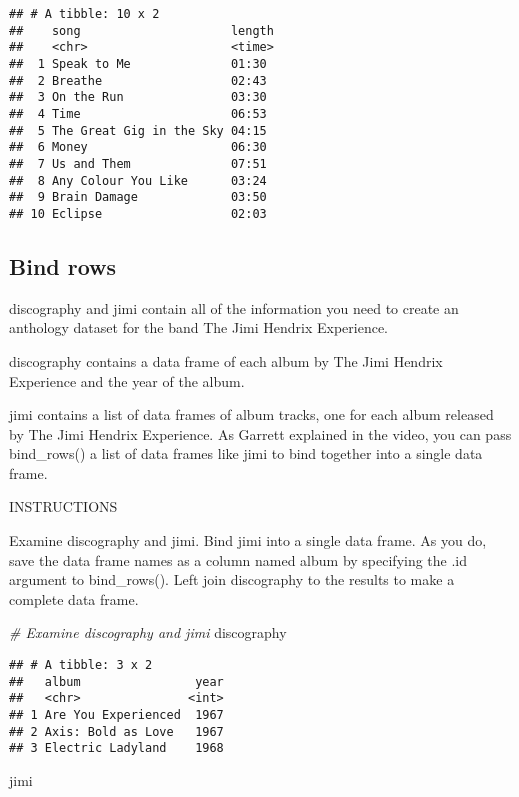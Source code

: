 \documentclass[]{article}
\newenvironment{Shaded}{\begin{snugshade}}{\end{snugshade}}
\newcommand{\CommentTok}[1]{\textcolor[rgb]{0.56,0.35,0.01}{\textit{#1}}}
\newcommand{\NormalTok}[1]{#1}
\begin{document}
\begin{verbatim}
## # A tibble: 10 x 2
##    song                     length
##    <chr>                    <time>
##  1 Speak to Me              01:30 
##  2 Breathe                  02:43 
##  3 On the Run               03:30 
##  4 Time                     06:53 
##  5 The Great Gig in the Sky 04:15 
##  6 Money                    06:30 
##  7 Us and Them              07:51 
##  8 Any Colour You Like      03:24 
##  9 Brain Damage             03:50 
## 10 Eclipse                  02:03
\end{verbatim}

\subsection{Bind rows}\label{bind-rows}

discography and jimi contain all of the information you need to create
an anthology dataset for the band The Jimi Hendrix Experience.

discography contains a data frame of each album by The Jimi Hendrix
Experience and the year of the album.

jimi contains a list of data frames of album tracks, one for each album
released by The Jimi Hendrix Experience. As Garrett explained in the
video, you can pass bind\_rows() a list of data frames like jimi to bind
together into a single data frame.

INSTRUCTIONS

Examine discography and jimi. Bind jimi into a single data frame. As you
do, save the data frame names as a column named album by specifying the
.id argument to bind\_rows(). Left join discography to the results to
make a complete data frame.

\begin{Shaded}
\begin{Highlighting}[]
\CommentTok{# Examine discography and jimi}
\NormalTok{discography}
\end{Highlighting}
\end{Shaded}

\begin{verbatim}
## # A tibble: 3 x 2
##   album                year
##   <chr>               <int>
## 1 Are You Experienced  1967
## 2 Axis: Bold as Love   1967
## 3 Electric Ladyland    1968
\end{verbatim}

\begin{Shaded}
\begin{Highlighting}[]
\NormalTok{jimi}
\end{Highlighting}
\end{Shaded}
\end{document}
